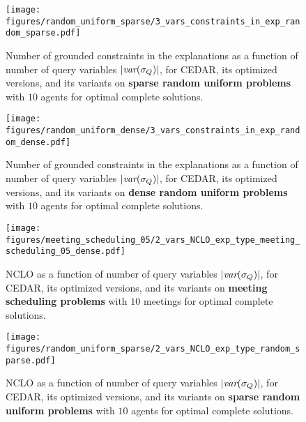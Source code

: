 \documentclass[twoside,11pt]{article}
\begin{document}
\begin{figure}[h]
\centering
\small
\texttt{[image: figures/random\_uniform\_sparse/3\_vars\_constraints\_in\_exp\_random\_sparse.pdf]} \\ 
\vspace{-0.5em} 
\caption{Number of grounded constraints in the explanations as a function of number of query variables $|{\textit{var}(\sigma_Q)}|$, for CEDAR, its optimized versions, and its variants on \textbf{sparse random uniform problems} with $10$ agents for optimal complete solutions.}

\label{fig:3_results_num_constraints_Q_sparse}
\end{figure}

\begin{figure}[h]
\centering
\small
\texttt{[image: figures/random\_uniform\_dense/3\_vars\_constraints\_in\_exp\_random\_dense.pdf]} \\ 
\vspace{-0.5em} 
\caption{Number of grounded constraints in the explanations as a function of number of query variables $|{\textit{var}(\sigma_Q)}|$, for CEDAR, its optimized versions, and its variants on \textbf{dense random uniform problems} with $10$ agents for optimal complete solutions.}

\label{fig:3_results_num_constraints_Q_dense}
\end{figure}



\begin{figure}[h]
\centering
\small
\texttt{[image: figures/meeting\_scheduling\_05/2\_vars\_NCLO\_exp\_type\_meeting\_scheduling\_05\_dense.pdf]} \\ 
\vspace{-0.5em} 
\caption{NCLO as a function of number of query variables $|{\textit{var}(\sigma_Q)}|$, for CEDAR, its optimized versions, and its variants on \textbf{meeting scheduling problems} with $10$ meetings for optimal complete solutions.}
\label{fig:2_NCLO_Q_meeting}
\end{figure}

\begin{figure}[h]
\centering
\small
\texttt{[image: figures/random\_uniform\_sparse/2\_vars\_NCLO\_exp\_type\_random\_sparse.pdf]} \\ 
\vspace{-0.5em} 
\caption{NCLO as a function of number of query variables $|{\textit{var}(\sigma_Q)}|$, for CEDAR, its optimized versions, and its variants on \textbf{sparse random uniform problems} with $10$ agents for optimal complete solutions.}

\label{fig:2_NCLO_Q_sparse}
\end{figure}
\end{document}
